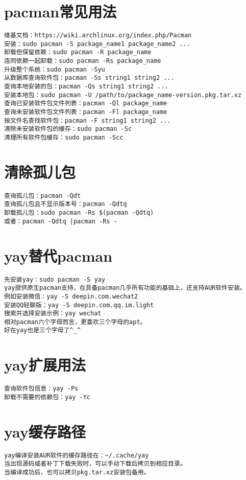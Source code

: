 \documentclass[a4paper,fontset=fandol,zihao=-4,linespread=1.2,oneside]{ctexbook}
\begin{document}
\section{pacman常见用法}
\begin{lstlisting}
维基文档：https://wiki.archlinux.org/index.php/Pacman
安装：sudo pacman -S package_name1 package_name2 ...
卸载但保留依赖：sudo pacman -R package_name
连同依赖一起卸载：sudo pacman -Rs package_name
升级整个系统：sudo pacman -Syu
从数据库查询软件包：pacman -Ss string1 string2 ...
查询本地安装的包：pacman -Qs string1 string2 ...
安装本地包：sudo pacman -U /path/to/package_name-version.pkg.tar.xz
查询已安装软件包文件列表：pacman -Ql package_name
查询未安装软件包文件列表：pacman -Fl package_name
按文件名查找软件包：pacman -F string1 string2 ...
清除未安装软件包的缓存：sudo pacman -Sc
清理所有软件包缓存：sudo pacman -Scc
\end{lstlisting}

\section{清除孤儿包}
\begin{lstlisting}
查询孤儿包：pacman -Qdt
查询孤儿包且不显示版本号：pacman -Qdtq
卸载孤儿包：sudo pacman -Rs $(pacman -Qdtq)
或者：pacman -Qdtq |pacman -Rs -
\end{lstlisting}

\section{yay替代pacman}
\begin{lstlisting}
先安装yay：sudo pacman -S yay
yay提供原生pacman支持，在具备pacman几乎所有功能的基础上，还支持AUR软件安装。
例如安装微信：yay -S deepin.com.wechat2
安装QQ轻聊版：yay -S deepin.com.qq.im.light
搜索并选择安装示例：yay wechat
相对pacman六个字母而言，更喜欢三个字母的apt。
好在yay也是三个字母了^_^
\end{lstlisting}

\section{yay扩展用法}
\begin{lstlisting}
查询软件包信息：yay -Ps
卸载不需要的依赖包：yay -Yc
\end{lstlisting}

\section{yay缓存路径}
\begin{lstlisting}
yay编译安装AUR软件的缓存路径在：~/.cache/yay
当出现源码或者补丁下载失败时，可以手动下载后拷贝到相应目录。
当编译成功后，也可以拷贝pkg.tar.xz安装包备用。
\end{lstlisting}
\end{document}
